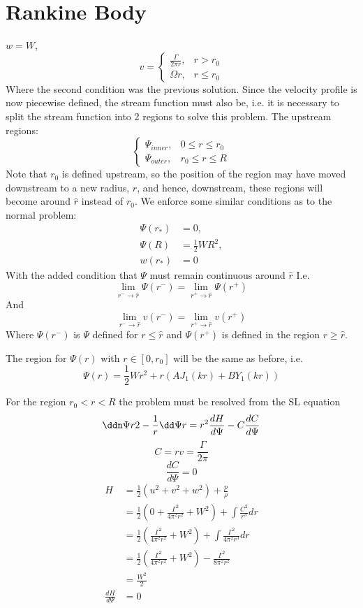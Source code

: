 \documentclass{X:/Documents/Coding/Latex/myreport}
\begin{document}
\section{Rankine Body}
$w = W$, 
\[v = \begin{cases}
    \frac{\Gamma}{{2 \pi r}}, &r > r_0 \\
\Omega r ,& r \leq r_0
\end{cases}  \]
Where the second condition was the previous solution. Since the velocity profile is now piecewise defined, the stream function must also be, i.e. it is necessary to split the stream function into 2 regions to solve this problem. The upstream regions:
 \[\begin{cases}
         \Psi_{inner}, & 0\leq r\leq r_0 \\
         \Psi_{outer}, & r_0\leq r\leq R
     \end{cases}
 \]
Note that $r_0$ is defined upstream, so the position of the region may have moved downstream to a new radius, $\hat{r}$, and hence, downstream, these regions will become around $\hat{r}$ instead of $r_0$. We enforce some similar conditions as to the normal problem:
\begin{align*}
    \Psi(r_*) &= 0, \\
    \Psi(R) &= \frac12 WR^2,\\
    w(r_*) &= 0
\end{align*}
With the added condition that $\Psi$ must remain continuous around $\hat{r}$
I.e.
\[\lim_{r^-\to \hat{r}} \Psi(r^-) = \lim_{r^+ \to \hat{r}} \Psi(r^+)\]
And
\[\lim_{r^- \to \hat{r}} v(r^-) = \lim_{r^+ \to \hat{r}} v(r^+)\]
Where $\Psi(r^-)$ is $\Psi$ defined for $r \leq \hat{r}$ and $\Psi(r^+)$ is defined in the region $r \geq \hat{r}$.

The region for $\Psi(r)$ with $r\in [0,r_0]$ will be the same as before, i.e.
\[\Psi(r) = \frac12 Wr^2 + r(AJ_1(kr) + BY_1(kr))\]

For the region $r_0<r<R$ the problem must be resolved from the SL equation
\[\ddn \Psi r 2 - \frac1r \dd\Psi r = r^2 \frac{dH}{d\Psi} - C \frac{dC}{d\Psi}\]
\[C = rv = \frac{\Gamma}{2\pi}\]
\[\frac{dC}{d\Psi} = 0\]
\begin{align*}
    H &= \frac12 (u^2 + v^2 + w^2) + \frac{p}{\rho}\\
    &= \frac12 (0 + \frac{\Gamma^2}{4\pi^2 r^2} + W^2) + \int \frac{C^2}{r^3} dr\\
    &=   \frac12 (\frac{\Gamma^2}{4\pi^2 r^2} + W^2) + \int \frac{\Gamma^2}{4 \pi^2r^3} dr\\
    &=   \frac12 (\frac{\Gamma^2}{4\pi^2 r^2} + W^2) -\frac{\Gamma^2}{8 \pi^2r^2} \\
    &= \frac{W^2}{2}\\
    \frac{dH}{d\Psi} &= 0
\end{align*}
\end{document}
